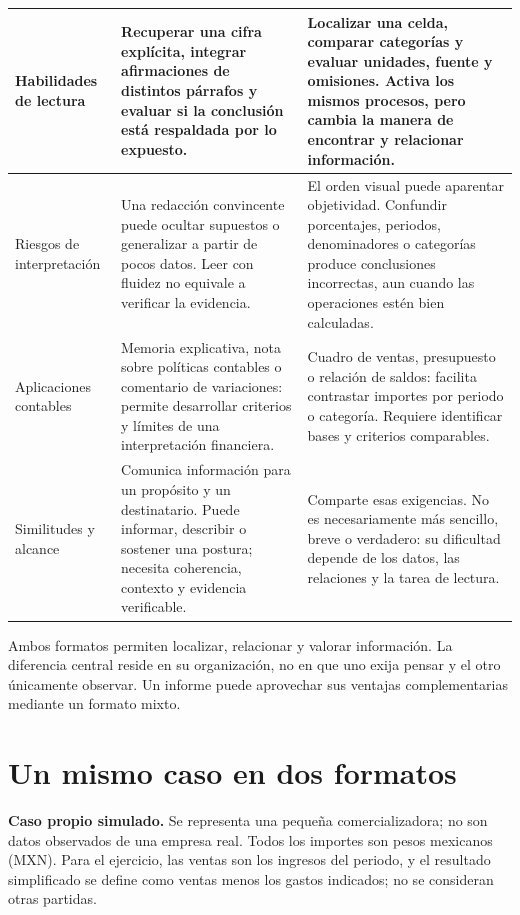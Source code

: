 \begin{longtable}{@{}L{2.5cm}L{6.5cm}L{\dimexpr\textwidth-9cm-4\tabcolsep\relax}@{}}
\newpage

Habilidades de lectura &
Recuperar una cifra explícita, integrar afirmaciones de distintos
párrafos y evaluar si la conclusión está respaldada por lo expuesto. &
Localizar una celda, comparar categorías y evaluar unidades, fuente y
omisiones. Activa los mismos procesos, pero cambia la manera de
encontrar y relacionar información. \\[.4em]
\midrule
Riesgos de interpretación &
Una redacción convincente puede ocultar supuestos o generalizar a
partir de pocos datos. Leer con fluidez no equivale a verificar
la evidencia. &
El orden visual puede aparentar objetividad. Confundir porcentajes,
periodos, denominadores o categorías produce conclusiones incorrectas,
aun cuando las operaciones estén bien calculadas. \\[.4em]
\midrule
Aplicaciones contables &
Memoria explicativa, nota sobre políticas contables o comentario de
variaciones: permite desarrollar criterios y límites de una
interpretación financiera. &
Cuadro de ventas, presupuesto o relación de saldos: facilita contrastar
importes por periodo o categoría. Requiere identificar bases y
criterios comparables. \\[.4em]
\midrule
Similitudes y alcance &
Comunica información para un propósito y un destinatario. Puede
informar, describir o sostener una postura; necesita coherencia,
contexto y evidencia verificable. &
Comparte esas exigencias. No es necesariamente más sencillo, breve
o verdadero: su dificultad depende de los datos, las relaciones
y la tarea de lectura. \\
\end{longtable}
\endgroup

Ambos formatos permiten localizar, relacionar y valorar información.
La diferencia central reside en su organización, no en que uno exija
pensar y el otro únicamente observar. Un informe puede aprovechar sus
ventajas complementarias mediante un formato mixto.

\clearpage
\section{Un mismo caso en dos formatos}

\textbf{Caso propio simulado.} Se representa una pequeña comercializadora;
no son datos observados de una empresa real. Todos los importes son pesos
mexicanos (MXN). Para el ejercicio, las ventas son los ingresos del
periodo, y el resultado simplificado se define como ventas menos los
gastos indicados; no se consideran otras partidas.

